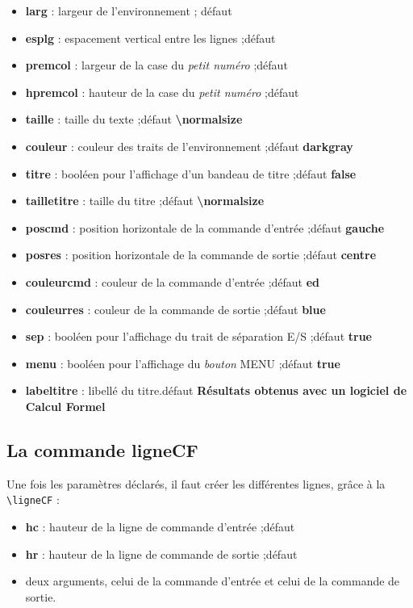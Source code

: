 \documentclass{article}
\newcommand\Cle[1]{{\bfseries\sffamily\textlangle #1\textrangle}}
\begin{document}
\begin{itemize}
	\item \Cle{larg} : largeur de l'environnement ; \hfill{}défaut \Cle{16}
	\item \Cle{esplg} : espacement vertical entre les lignes ;\hfill{}défaut \Cle{2pt}
	\item \Cle{premcol} : largeur de la case du \textit{petit numéro} ;\hfill{}défaut \Cle{0.3}
	\item \Cle{hpremcol} : hauteur de la case du \textit{petit numéro} ;\hfill{}défaut \Cle{0.4}
	\item \Cle{taille} : taille du texte ;\hfill{}défaut \Cle{\textbackslash normalsize}
	\item \Cle{couleur} : couleur des traits de l'environnement ;\hfill{}défaut \Cle{darkgray}
	\item \Cle{titre} : booléen pour l'affichage d'un bandeau de titre ;\hfill{}défaut \Cle{false}
	\item \Cle{tailletitre} : taille du titre ;\hfill{}défaut \Cle{\textbackslash normalsize}
	\item \Cle{poscmd} : position horizontale de la commande d'entrée ;\hfill{}défaut \Cle{gauche}
	\item \Cle{posres} : position horizontale de la commande de sortie ;\hfill{}défaut \Cle{centre}
	\item \Cle{couleurcmd} : couleur de la commande d'entrée ;\hfill{}défaut \Cle{ed}
	\item \Cle{couleurres} : couleur de la commande de sortie ;\hfill{}défaut \Cle{blue}
	\item \Cle{sep} : booléen pour l'affichage du trait de séparation E/S ;\hfill{}défaut \Cle{true}
	\item \Cle{menu} : booléen pour l'affichage du \textit{bouton} MENU ;\hfill{}défaut \Cle{true}
	\item \Cle{labeltitre} : libellé du titre.\hfill{}défaut \Cle{Résultats obtenus avec un logiciel de Calcul Formel}
\end{itemize}

\subsection{La commande \og ligneCF \fg}

Une fois les paramètres déclarés, il faut créer les différentes lignes, grâce à la \verb|\ligneCF| :

\begin{itemize}
	\item \Cle{hc} : hauteur de la ligne de commande d'entrée ;\hfill{}défaut \Cle{0.75}
	\item \Cle{hr} : hauteur de la ligne de commande de sortie ;\hfill{}défaut \Cle{0.75}
	\item deux \textsf{arguments}, celui de la commande d'entrée et celui de la commande de sortie.
\end{itemize}
\end{document}
